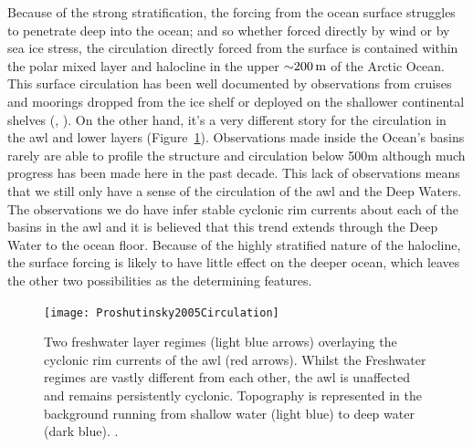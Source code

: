 \documentclass[10pt,a4paper]{article}
\begin{document}
Because of the strong stratification, the forcing from the ocean surface 
struggles to penetrate deep into the ocean; and so whether forced directly by wind 
or by sea ice stress, the circulation
directly forced from the surface is contained within the polar mixed layer 
and halocline in the upper ${\sim}200\,{\rm m}$ of the Arctic Ocean. 
This surface circulation has been well documented by observations
from cruises and moorings  dropped  from  the  ice  shelf  or  deployed  on 
the  shallower  continental  shelves (\cite{gerdes1997large}, \cite{jones2001circulation}). On the other hand, it's a very different
story for the circulation in the \gls{awl} and lower layers (Figure~\ref{fig:Proshutinsky2005Circulation}). Observations made
inside the Ocean's basins rarely are able to profile the structure  and
circulation  below 500m  although much progress has been made here in the
past decade. This lack of observations means that  we  still only have  a  sense  of  the circulation 
of the \gls{awl} and the Deep  Waters.  The  observations  we  do 
have  infer stable cyclonic  rim  currents about each of the basins in the
\gls{awl} and it is believed that this trend extends through the Deep Water to the 
ocean floor.  Because of the highly stratified nature of the halocline, the surface forcing 
is likely to have little effect on the deeper ocean, which leaves the other 
two possibilities as the determining features.


\begin{figure}
	\centering
	\texttt{[image: Proshutinsky2005Circulation]}
	\caption[\cite{proshutinsky2005arctic}]{ Two freshwater layer regimes (light 
		blue arrows) overlaying the cyclonic rim currents of the \gls{awl} (red arrows).
		Whilst the Freshwater regimes are vastly different from each other, the
		\gls{awl} is unaffected and remains persistently cyclonic.
		Topography is represented in the background running from 
		shallow water (light blue) to deep water (dark blue).  \cite{proshutinsky2005arctic}.}
	\label{fig:Proshutinsky2005Circulation}
\end{figure}
\end{document}
